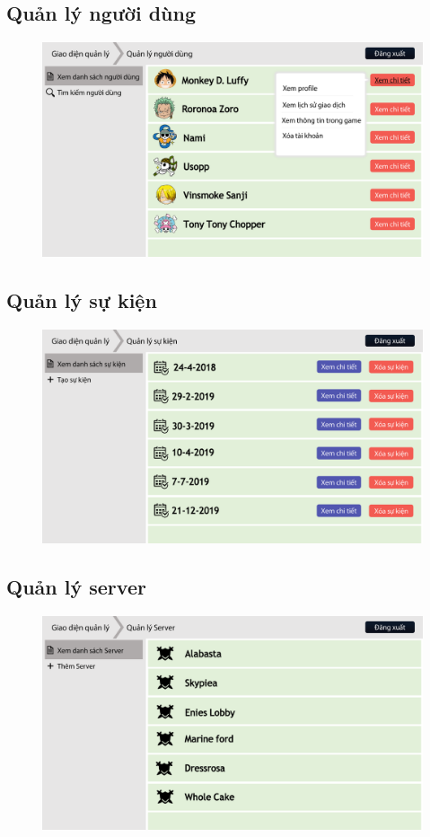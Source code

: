 \documentclass[3p]{elsarticle}
\begin{document}
\subsection{Quản lý người dùng}
\begin{figure}[!htbp]
	\centering
	\includegraphics[scale=.4]{images/usermanagement.pdf}
\end{figure}
\subsection{Quản lý sự kiện}
\begin{figure}[!htbp]
	\centering
	\includegraphics[scale=.4]{images/eventmanagement.pdf}
\end{figure}
\newpage
\subsection{Quản lý server}
\begin{figure}[!htbp]
	\centering
	\includegraphics[scale=.4]{images/servermanagement.pdf}
\end{figure}
\end{document}

